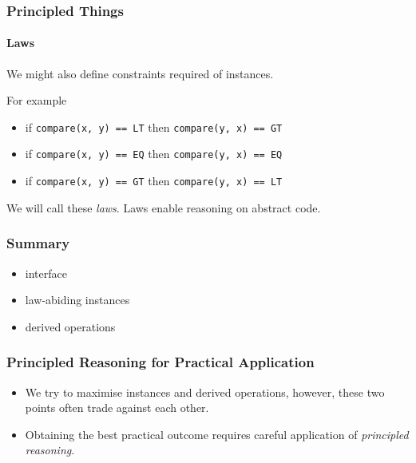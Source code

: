 \begin{frame}
\frametitle{Principled Things}
\framesubtitle{Laws}
We might also define constraints required of instances.
\begin{block}{For example}
\begin{itemize}
\item if \lstinline{compare(x, y) == LT} then \lstinline{compare(y, x) == GT}
\item if \lstinline{compare(x, y) == EQ} then \lstinline{compare(y, x) == EQ}
\item if \lstinline{compare(x, y) == GT} then \lstinline{compare(y, x) == LT}
\end{itemize}
\end{block}
We will call these \emph{laws}. Laws enable reasoning on abstract code.
\end{frame}

\begin{frame}
\frametitle{Summary}
\begin{itemize}
\item interface
\item law-abiding instances
\item derived operations
\end{itemize}
\end{frame}

\begin{frame}
\frametitle{Principled Reasoning for Practical Application}
\begin{itemize}
\item We try to maximise instances and derived operations, however, these two points often trade against each other.
\item Obtaining the best practical outcome requires careful application of \emph{principled reasoning}.
\end{itemize}
\end{frame}
